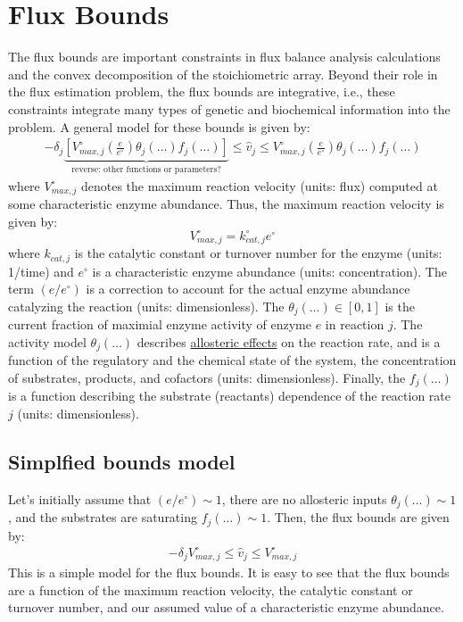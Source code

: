 \documentclass{article}[11pt]
\begin{document}
\section{Flux Bounds}\label{sec-flux-bounds}
The flux bounds are important constraints in flux balance analysis calculations and the convex decomposition of the stoichiometric array. 
Beyond their role in the flux estimation problem, the flux bounds are integrative, i.e., these constraints integrate many types of genetic and biochemical information into the problem. 
A general model for these bounds is given by:
\begin{align*}
-\delta_{j}\underbrace{\left[{V_{max,j}^{\circ}}\left(\frac{e}{e^{\circ}}\right)\theta_{j}\left(\dots\right){f_{j}\left(\dots\right)}\right]}_{\text{reverse: other functions or parameters?}}\leq\hat{v}_{j}\leq{V_{max,j}^{\circ}}\left(\frac{e}{e^{\circ}}\right)\theta_{j}\left(\dots\right){f_{j}\left(\dots\right)}
\end{align*}
where $V_{max,j}^{\circ}$ denotes the maximum reaction velocity (units: flux) computed at some characteristic enzyme abundance. 
Thus, the maximum reaction velocity is given by:
\begin{equation*}
V_{max,j}^{\circ} = k_{cat,j}^{\circ}e^{\circ}
\end{equation*}
where $k_{cat,j}$ is the catalytic constant or turnover number for the enzyme (units: 1/time) and $e^{\circ}$ is a characteristic enzyme abundance (units: concentration). 
The term $\left(e/e^{\circ}\right)$ is a correction to account for the actual enzyme abundance catalyzing the reaction (units: dimensionless). 
The $\theta_{j}\left(\dots\right)\in\left[0,1\right]$ is the current fraction of maximial enzyme activity of enzyme $e$ in reaction $j$. 
The activity model $\theta_{j}\left(\dots\right)$ describes \href{https://en.wikipedia.org/wiki/Allosteric_regulation}{allosteric effects} on the reaction rate, 
and is a function of the regulatory and the chemical state of the system, the concentration of substrates, products, and cofactors (units: dimensionless).
Finally, the $f_{j}\left(\dots\right)$ is a function describing the substrate (reactants) dependence of the reaction rate $j$ (units: dimensionless). 

\subsection{Simplfied bounds model}
Let's initially assume that $(e/e^{\circ})\sim{1}$, there are no allosteric inputs $\theta_{j}\left(\dots\right)\sim{1}$, and the substrates are saturating $f_{j}\left(\dots\right)\sim{1}$. 
Then, the flux bounds are given by:
\begin{align*}
-\delta_{j}V_{max,j}^{\circ}\leq{\hat{v}_{j}}\leq{V_{max,j}^{\circ}}
\end{align*}
This is a simple model for the flux bounds. 
It is easy to see that the flux bounds are a function of the maximum reaction velocity, the catalytic constant or turnover number, and our assumed value of a characteristic enzyme abundance.
\end{document}
